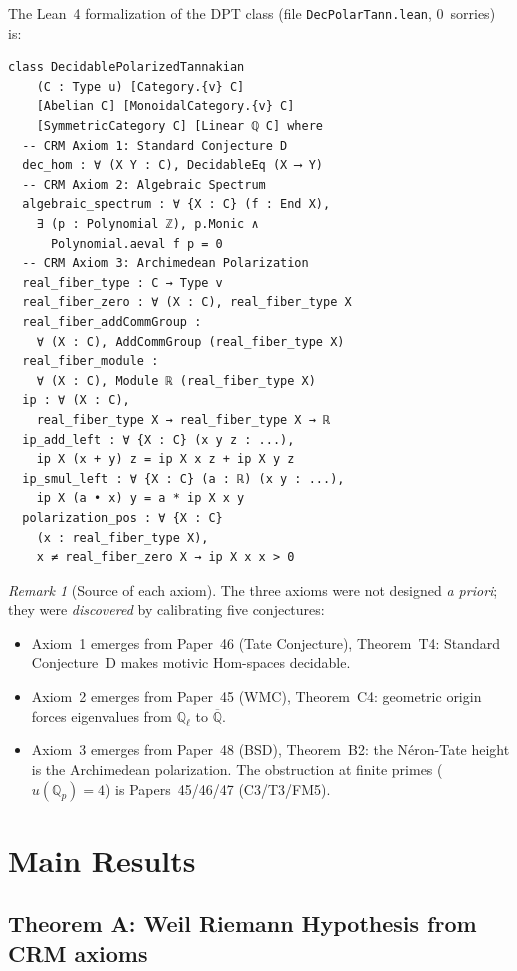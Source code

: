 \documentclass[11pt]{article}
\theoremstyle{definition}
\theoremstyle{remark}
\newtheorem{remark}[theorem]{Remark}
\newcommand{\Q}{\mathbb{Q}}
\newcommand{\Qbar}{\overline{\Q}}
\newcommand{\Qell}{\Q_\ell}
\newcommand{\Qp}{\Q_p}
\begin{document}
The Lean~4 formalization of the DPT class (file \texttt{DecPolarTann.lean}, 0~sorries) is:

\begin{lstlisting}
class DecidablePolarizedTannakian
    (C : Type u) [Category.{v} C]
    [Abelian C] [MonoidalCategory.{v} C]
    [SymmetricCategory C] [Linear ℚ C] where
  -- CRM Axiom 1: Standard Conjecture D
  dec_hom : ∀ (X Y : C), DecidableEq (X ⟶ Y)
  -- CRM Axiom 2: Algebraic Spectrum
  algebraic_spectrum : ∀ {X : C} (f : End X),
    ∃ (p : Polynomial ℤ), p.Monic ∧
      Polynomial.aeval f p = 0
  -- CRM Axiom 3: Archimedean Polarization
  real_fiber_type : C → Type v
  real_fiber_zero : ∀ (X : C), real_fiber_type X
  real_fiber_addCommGroup :
    ∀ (X : C), AddCommGroup (real_fiber_type X)
  real_fiber_module :
    ∀ (X : C), Module ℝ (real_fiber_type X)
  ip : ∀ (X : C),
    real_fiber_type X → real_fiber_type X → ℝ
  ip_add_left : ∀ {X : C} (x y z : ...),
    ip X (x + y) z = ip X x z + ip X y z
  ip_smul_left : ∀ {X : C} (a : ℝ) (x y : ...),
    ip X (a • x) y = a * ip X x y
  polarization_pos : ∀ {X : C}
    (x : real_fiber_type X),
    x ≠ real_fiber_zero X → ip X x x > 0
\end{lstlisting}

\begin{remark}[Source of each axiom]
The three axioms were not designed \emph{a priori}; they were \emph{discovered} by calibrating five conjectures:
\begin{itemize}
\item Axiom~1 emerges from Paper~46 (Tate Conjecture), Theorem~T4: Standard Conjecture~D makes motivic Hom-spaces decidable.
\item Axiom~2 emerges from Paper~45 (WMC), Theorem~C4: geometric origin forces eigenvalues from $\Qell$ to $\Qbar$.
\item Axiom~3 emerges from Paper~48 (BSD), Theorem~B2: the N\'eron-Tate height is the Archimedean polarization. The obstruction at finite primes ($u(\Qp) = 4$) is Papers~45/46/47 (C3/T3/FM5).
\end{itemize}
\end{remark}

\section{Main Results}
\label{sec:results}

\subsection{Theorem A: Weil Riemann Hypothesis from CRM axioms}
\end{document}
